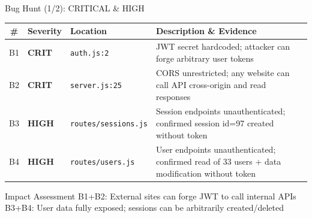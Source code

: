 \documentclass[aspectratio=169,utf8,11pt]{beamer}
\newcommand{\bug}[1]{\textcolor{bugred}{\textbf{#1}}}
\begin{document}
\begin{frame}{Bug Hunt (1/2): CRITICAL \& HIGH}
  \begin{table}[h]
    \centering
    \renewcommand{\arraystretch}{1.15}
    \small
    \begin{tabular}{clp{4.5cm}p{4.5cm}}
      \toprule
      \textbf{\#} & \textbf{Severity} & \textbf{Location} & \textbf{Description \& Evidence} \\
      \midrule
      B1 & \bug{CRIT} & \texttt{auth.js:2} & JWT secret hardcoded; attacker can forge arbitrary user tokens \\
      B2 & \bug{CRIT} & \texttt{server.js:25} & CORS unrestricted; any website can call API cross-origin and read responses \\
      B3 & \bug{HIGH} & \texttt{routes/sessions.js} & Session endpoints unauthenticated; confirmed session id=97 created without token \\
      B4 & \bug{HIGH} & \texttt{routes/users.js} & User endpoints unauthenticated; confirmed read of 33 users + data modification without token \\
      \bottomrule
    \end{tabular}
  \end{table}
  \vspace{-0.1cm}
  \begin{block}{Impact Assessment}
    \footnotesize B1+B2: External sites can forge JWT to call internal APIs\\[0.1em]
    B3+B4: User data fully exposed; sessions can be arbitrarily created/deleted
  \end{block}
\end{frame}
\end{document}
